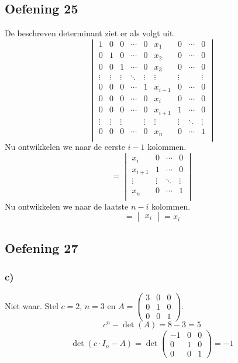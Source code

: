 \documentclass[lineaire_algebra_oplossingen.tex]{subfiles}
\begin{document}
\subsection{Oefening 25}
De beschreven determinant ziet er als volgt uit.
\[
\begin{vmatrix}
1 & 0 & 0 & \cdots & 0 & x_1 & 0 & \cdots & 0 \\
0 & 1 & 0 & \cdots & 0 & x_2 & 0 & \cdots & 0 \\
0 & 0 & 1 & \cdots & 0 & x_3 & 0 & \cdots & 0 \\
\vdots & \vdots & \vdots & \ddots  & \vdots & \vdots & \vdots &  & \vdots\\
0 & 0 & 0 & \cdots & 1 & x_{i-1} & 0 &\cdots & 0 \\
0 & 0 & 0 & \cdots & 0 & x_i & 0 & \cdots & 0 \\
0 & 0 & 0 & \cdots & 0 & x_{i+1} & 1 & \cdots & 0 \\
\vdots & \vdots & \vdots &  & \vdots & \vdots & \vdots & \ddots & \vdots\\
0 & 0 & 0 & \cdots & 0 & x_n & 0 & \cdots & 1\\
\end{vmatrix}
\]
Nu ontwikkelen we naar de eerste $i-1$ kolommen.
\[
= 
\begin{vmatrix}
x_i & 0 & \cdots & 0 \\
x_{i+1} & 1 & \cdots & 0 \\
\vdots & \vdots & \ddots & \vdots\\
 x_n & 0 & \cdots & 1\\
\end{vmatrix}
\]
Nu ontwikkelen we naar de laatste $n -i$ kolommen.
\[
= 
\begin{vmatrix}
x_i
\end{vmatrix}
= x_i
\]


\subsection{Oefening 27}
\subsubsection*{c)}
Niet waar. Stel $c=2$, $n=3$ en $A=
\begin{pmatrix}
3 & 0 & 0\\
0 & 1 & 0\\
0 & 0 & 1
\end{pmatrix} 
$.
\[c^{n}-\det(A) = 8 - 3 = 5\]
\[ \det(c \cdot I_n-A) = \det
\begin{pmatrix}
-1 & 0 & 0 \\
0 & 1 & 0\\
0 & 0 & 1
\end{pmatrix}
= -1\]
\end{document}
